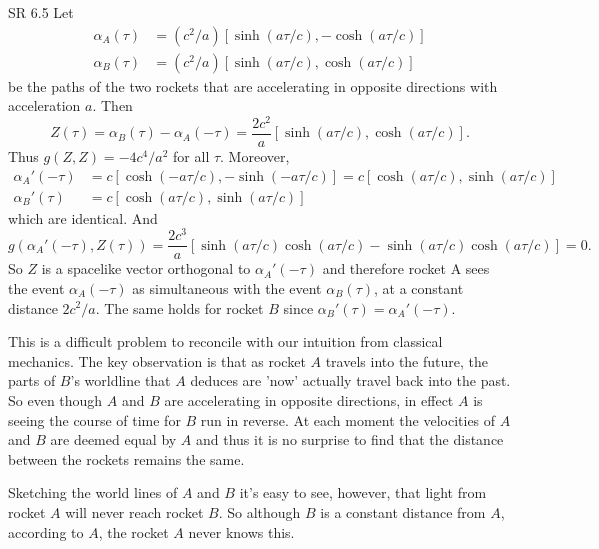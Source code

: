 \documentclass[minion]{homework}
\begin{document}
\begin{aproblems}
\hproblem SR 6.5
\solution
Let 
\begin{align}
\alpha_A(\tau) &= (c^2/a) [ \sinh(a\tau/c), -\cosh(a\tau/c)] \\
\alpha_B(\tau) &= (c^2/a) [ \sinh(a\tau/c), \cosh(a\tau/c)]
\end{align}
be the paths of the two rockets that are accelerating in opposite directions
with acceleration $a$.  Then
\[
Z(\tau) = \alpha_B(\tau) - \alpha_A(-\tau) = \frac{2c^2}{a} [ \sinh(a\tau/c), \cosh(a\tau/c)].
\]
Thus $g(Z,Z)=-4c^4/a^2$ for all $\tau$.  Moreover,
\begin{align}
\alpha_A'(-\tau) &= c [ \cosh(-a\tau/c), -\sinh(-a\tau/c)]  = 
c [ \cosh(a\tau/c), \sinh(a\tau/c)]\\
\alpha_B'(\tau) &= c [ \cosh(a\tau/c), \sinh(a\tau/c)]
\end{align}
which are identical.  And
\[
g(\alpha_A'(-\tau),Z(\tau)) = \frac{2c^3}{a} \left[ \sinh(a\tau/c)\cosh(a\tau/c)
- \sinh(a\tau/c)\cosh(a\tau/c)\right] = 0.
\]
So $Z$ is a spacelike vector orthogonal to $\alpha_A'(-\tau)$ and 
therefore rocket A sees the event $\alpha_A(-\tau)$ as simultaneous
with the event $\alpha_B(\tau)$, at a constant distance $2c^2/a$.
The same holds for rocket $B$ since $\alpha_B'(\tau)=\alpha_A'(-\tau)$.

This is a difficult problem to reconcile with our intuition from classical mechanics.  The key observation is that as rocket $A$ travels into the future,
the parts of $B$'s worldline that $A$ deduces are 'now' actually travel back into the past.  So even though $A$ and $B$ are accelerating in opposite directions, in effect $A$ is seeing the course of time for $B$ run in reverse.  At each moment the velocities of $A$ and $B$ are deemed equal by $A$ and thus it is no surprise to find that the distance between the rockets remains the same.

Sketching the world lines of $A$ and $B$ it's easy to see, however, that 
light from rocket $A$ will never reach rocket $B$.  So although $B$ is a constant distance from $A$, according to $A$, the rocket $A$ never knows this.


\end{aproblems}
\end{document}
